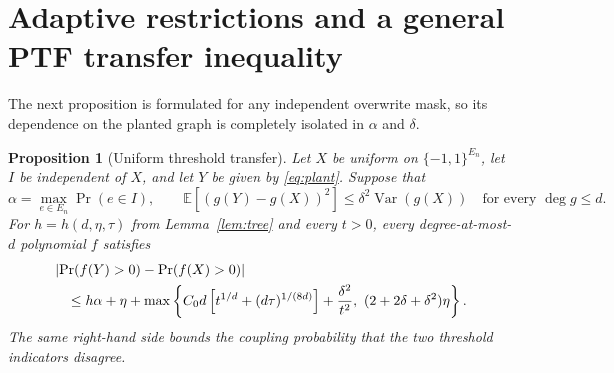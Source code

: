 \documentclass[11pt]{article}
\newcommand{\E}{\mathbb E}
\newcommand{\Var}{\operatorname{Var}}
\newcommand{\1}{\mathbf 1}
\newtheorem{proposition}[theorem]{Proposition}
\theoremstyle{definition}
\theoremstyle{remark}
\numberwithin{equation}{section}
\begin{document}
\section{Adaptive restrictions and a general PTF transfer inequality}

The next proposition is formulated for any independent overwrite mask, so its dependence on the planted graph is completely isolated in $\alpha$ and $\delta$.

\begin{proposition}[Uniform threshold transfer]\label{prop:transfer}
Let $X$ be uniform on $\{-1,1\}^{E_n}$, let $I$ be independent of $X$, and let $Y$ be given by \eqref{eq:plant}. Suppose that
\[
 \alpha=\max_{e\in E_n}\Pr(e\in I),\qquad
 \E[(g(Y)-g(X))^2]\le\delta^2\Var(g(X))
 \quad\text{for every }\deg g\le d.
\]
For $h=h(d,\eta,\tau)$ from Lemma~\ref{lem:tree} and every $t>0$, every degree-at-most-$d$ polynomial $f$ satisfies
\begin{align}
 &\left|\Pr(f(Y)>0)-\Pr(f(X)>0)\right|\notag\\
 &\quad\le h\alpha+\eta+
 \max\left\{
 C_0d\left[t^{1/d}+(d\tau)^{1/(8d)}\right]+\frac{\delta^2}{t^2},
 \ (2+2\delta+\delta^2)\eta
 \right\}.
\end{align}
The same right-hand side bounds the coupling probability that the two threshold indicators disagree.
\end{proposition}
\end{document}
